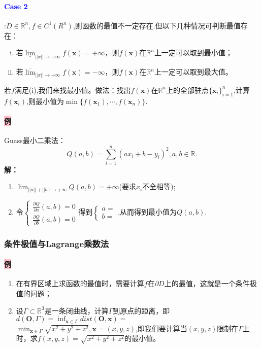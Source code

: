 \documentclass[UTF8]{ctexart}
\newcommand{\p}[2]{\frac{\partial #1}{\partial #2}}
\newcommand{\x}{\boldsymbol{x}}
\begin{document}
    \vspace{2ex}
    \paragraph{\textcolor{blue}{Case 2}}:$D\in \mathbb{R}^n,f\in C^1(R^n)$,则函数的最值不一定存在.但以下几种情况可判断最值存在：
    \begin{enumerate}[(i)]
        \item 若$\underline{\lim}_{||x||\to+\infty}f(\x)=+\infty$，则$f(\x)$在$\mathbb{R}^n$上一定可以取到最小值；
        \item 若$\overline{\lim}_{||x||\to+\infty}f(\x)=-\infty$，则$f(\x)$在$\mathbb{R}^n$上一定可以取到最大值。
    \end{enumerate}
    若$f$满足(i),我们来找最小值。做法：找出$f(\x)$在$\mathbb{R}^n$上的全部驻点$\{\x_i\}_{i=1}^n$,计算$f(\x_i)$,则最小值为$\min\{f(\x_1),\cdots,f(\x_n)\}$.

    \paragraph{\colorbox{pink}{例}}Guass最小二乘法：
    $$Q(a,b)=\sum_{i=1}^n(ax_i+b-y_i)^2,a,b\in\mathbb{R}.$$
    \textbf{解：}
    \begin{enumerate}[{Step} 1{:}]
        \item $\lim_{||a||+||b||\to+\infty}Q(a,b)=+\infty$(要求$x_i$不全相等);
        \item 令$\begin{cases}
            \p{Q}{a}(a,b)=0\\
            \p{Q}{b}(a,b)=0
        \end{cases}$得到$\begin{cases}
            a=\\
            b=
        \end{cases}$,从而得到最小值为$Q(a,b)$.
    \end{enumerate}

    
    \subsubsection{条件极值与Lagrange乘数法}
    \paragraph{\colorbox{pink}{例}}
    \begin{enumerate}[(1)]
        \item 在有界区域上求函数的最值时，需要计算$f$在$\partial D$上的最值，这就是一个条件极值的问题；
        \item 设$\Gamma\subset\mathbb{R}^3$是一条闭曲线，计算$\Gamma$到原点的距离，即$d(\boldsymbol{O},\Gamma)=\inf_{\x\in\Gamma}dist(\boldsymbol{O},\x)=$\\$\min_{\x\in\Gamma}\sqrt{x^2+y^2+z^2},\x=(x,y,z)$,即我们要计算当$(x,y,z)$限制在$\Gamma$上时，求$f(x,y,z)=\sqrt{x^2+y^2+z^2}$的最小值。
    \end{enumerate}
\end{document}
